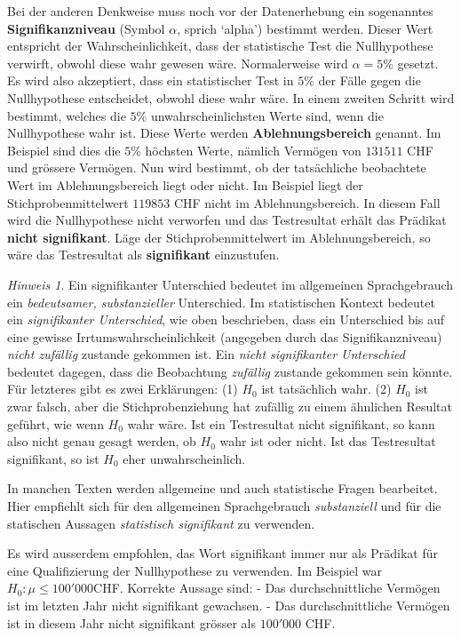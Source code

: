 \documentclass[
]{book}
\theoremstyle{definition}
\theoremstyle{definition}
\theoremstyle{definition}
\theoremstyle{definition}
\theoremstyle{remark}
\newtheorem*{remark}{Hinweis}
\begin{document}
\label{customdef-signifikanzniveau}{Bei der anderen Denkweise muss noch vor der Datenerhebung ein sogenanntes \textbf{Signifikanzniveau} (Symbol \(\alpha\), sprich `alpha') bestimmt werden. Dieser Wert entspricht der Wahrscheinlichkeit, dass der statistische Test die Nullhypothese verwirft, obwohl diese wahr gewesen wäre. Normalerweise wird \(\alpha = 5\%\) gesetzt.} Es wird also akzeptiert, dass ein statistischer Test in \(5\%\) der Fälle gegen die Nullhypothese entscheidet, obwohl diese wahr wäre. \label{customdef-ablehnungsbereich}{In einem zweiten Schritt wird bestimmt, welches die \(5\%\) unwahrscheinlichsten Werte sind, wenn die Nullhypothese wahr ist. Diese Werte werden \textbf{Ablehnungsbereich} genannt.} Im Beispiel sind dies die \(5\%\) höchsten Werte, nämlich Vermögen von \(131511\) CHF und grössere Vermögen. Nun wird bestimmt, ob der tatsächliche beobachtete Wert im Ablehnungsbereich liegt oder nicht. \label{customdef-signifikanz}{Im Beispiel liegt der Stichprobenmittelwert \(119853\) CHF nicht im Ablehnungsbereich. In diesem Fall wird die Nullhypothese nicht verworfen und das Testresultat erhält das Prädikat \textbf{nicht signifikant}. Läge der Stichprobenmittelwert im Ablehnungsbereich, so wäre das Testresultat als \textbf{signifikant} einzustufen.}

\begin{caution}

\begin{remark}
Ein signifikanter Unterschied bedeutet im allgemeinen Sprachgebrauch ein \emph{bedeutsamer, substanzieller} Unterschied. Im statistischen Kontext bedeutet ein \emph{signifikanter Unterschied}, wie oben beschrieben, dass ein Unterschied bis auf eine gewisse Irrtumswahrscheinlichkeit (angegeben durch das Signifikanzniveau) \emph{nicht zufällig} zustande gekommen ist. Ein \emph{nicht signifikanter Unterschied} bedeutet dagegen, dass die Beobachtung \emph{zufällig} zustande gekommen sein könnte. Für letzteres gibt es zwei Erklärungen: (1) \(H_0\) ist tatsächlich wahr. (2) \(H_0\) ist zwar falsch, aber die Stichprobenziehung hat zufällig zu einem ähnlichen Resultat geführt, wie wenn \(H_0\) wahr wäre. Ist ein Testresultat nicht signifikant, so kann also nicht genau gesagt werden, ob \(H_0\) wahr ist oder nicht. Ist das Testresultat signifikant, so ist \(H_0\) eher unwahrscheinlich.

In manchen Texten werden allgemeine und auch statistische Fragen bearbeitet. Hier empfiehlt sich für den allgemeinen Sprachgebrauch \emph{substanziell} und für die statischen Aussagen \emph{statistisch signifikant} zu verwenden.

Es wird ausserdem empfohlen, das Wort signifikant immer nur als Prädikat für eine Qualifizierung der Nullhypothese zu verwenden. Im Beispiel war \(H_0: \mu \leq 100'000\)CHF. Korrekte Aussage sind:
- Das durchschnittliche Vermögen ist im letzten Jahr nicht signifikant gewachsen.
- Das durchschnittliche Vermögen ist in diesem Jahr nicht signifikant grösser als \(100'000\) CHF.
\end{remark}

\end{caution}
\end{document}
